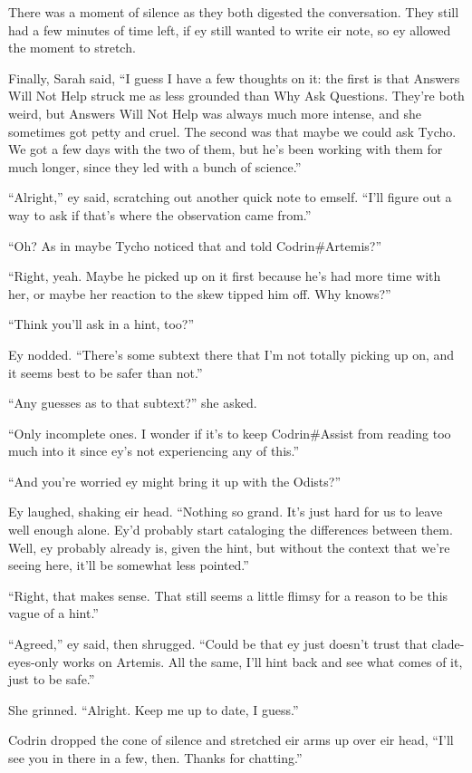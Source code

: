 There was a moment of silence as they both digested the conversation. They still had a few minutes of time left, if ey still wanted to write eir note, so ey allowed the moment to stretch.

Finally, Sarah said, ``I guess I have a few thoughts on it: the first is that Answers Will Not Help struck me as less grounded than Why Ask Questions. They're both weird, but Answers Will Not Help was always much more intense, and she sometimes got petty and cruel. The second was that maybe we could ask Tycho. We got a few days with the two of them, but he's been working with them for much longer, since they led with a bunch of science.''

``Alright,'' ey said, scratching out another quick note to emself. ``I'll figure out a way to ask if that's where the observation came from.''

``Oh? As in maybe Tycho noticed that and told Codrin\#Artemis?''

``Right, yeah. Maybe he picked up on it first because he's had more time with her, or maybe her reaction to the skew tipped him off. Why knows?''

``Think you'll ask in a hint, too?''

Ey nodded. ``There's some subtext there that I'm not totally picking up on, and it seems best to be safer than not.''

``Any guesses as to that subtext?'' she asked.

``Only incomplete ones. I wonder if it's to keep Codrin\#Assist from reading too much into it since ey's not experiencing any of this.''

``And you're worried ey might bring it up with the Odists?''

Ey laughed, shaking eir head. ``Nothing so grand. It's just hard for us to leave well enough alone. Ey'd probably start cataloging the differences between them. Well, ey probably already is, given the hint, but without the context that we're seeing here, it'll be somewhat less pointed.''

``Right, that makes sense. That still seems a little flimsy for a reason to be this vague of a hint.''

``Agreed,'' ey said, then shrugged. ``Could be that ey just doesn't trust that clade-eyes-only works on Artemis. All the same, I'll hint back and see what comes of it, just to be safe.''

She grinned. ``Alright. Keep me up to date, I guess.''

Codrin dropped the cone of silence and stretched eir arms up over eir head, ``I'll see you in there in a few, then. Thanks for chatting.''

